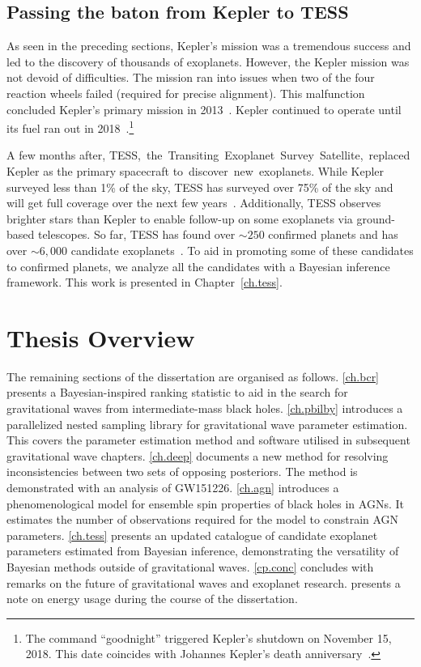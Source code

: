 \subsection{Passing the baton from Kepler to TESS }
As seen in the preceding sections, Kepler's mission was a tremendous success and led to the discovery of thousands of exoplanets.
However, the Kepler mission was not devoid of difficulties.
The mission ran into issues when two of the four reaction wheels failed (required for precise alignment). 
This malfunction concluded Kepler's primary mission in 2013~\cite{cowen2013wheels}.
Kepler continued to operate until its fuel ran out in 2018~\cite{KeplerShutdown}.\footnote{The command ``goodnight'' triggered Kepler's shutdown on November 15, 2018. This date coincides with Johannes Kepler's death anniversary~\cite{KeplerShutdown}.}

A few months after, TESS, the Transiting Exoplanet Survey Satellite, replaced Kepler as the primary spacecraft to discover new exoplanets.
While Kepler surveyed less than 1\% of the sky, TESS has surveyed over 75\% of the sky and will get full coverage over the next few years~\cite{tess}. 
Additionally, TESS observes brighter stars than Kepler to enable follow-up on some exoplanets via ground-based telescopes.  
So far, TESS has found over $\sim250$ confirmed planets and has over $\sim6,000$ candidate exoplanets~\cite{Akeson:2019:AAS,  Stassun:2019:AJ}. 
To aid in promoting some of these candidates to confirmed planets, we analyze all the candidates with a Bayesian inference framework. 
This work is presented in Chapter~\ref{ch.tess}.


\section{Thesis Overview}
The remaining sections of the dissertation are organised as follows. 
\cref{ch.bcr} presents a Bayesian-inspired ranking statistic to aid in the search for gravitational waves from intermediate-mass black holes. 
\cref{ch.pbilby} introduces a parallelized nested sampling library for gravitational wave parameter estimation. 
This covers the parameter estimation method and software utilised in subsequent gravitational wave chapters. 
\cref{ch.deep} documents a new method for resolving inconsistencies between two sets of opposing posteriors. 
The method is demonstrated with an analysis of GW151226. 
\cref{ch.agn} introduces a phenomenological model for ensemble spin properties of black holes in AGNs. It estimates the number of observations required for the model to constrain AGN parameters. 
\cref{ch.tess} presents an updated catalogue of candidate exoplanet parameters estimated from Bayesian inference, demonstrating the versatility of Bayesian methods outside of gravitational waves.
\cref{cp.conc} concludes with remarks on the future of gravitational waves and exoplanet research.
 presents a note on energy usage during the course of the dissertation. 
